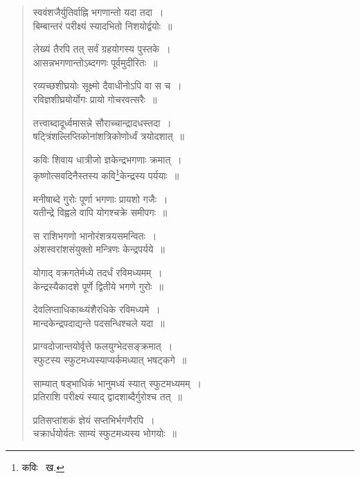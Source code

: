\documentclass[11pt, openany]{book}
\begin{document}
\begin{quote}
{\qt स्ववंशजैर्युतिर्वाह्नि भगणान्तो यदा तदा~।\\
बिम्बान्तरं परीक्ष्यं स्यादभितो निशयोर्द्वयोः~॥

लेख्यं तैरपि तत् सर्वं ग्रहयोगस्य पुस्तके~।\\
आसन्नभगणान्तोऽब्दगणः पूर्वमुदीरितः~॥

रव्यच्छशीघ्रयोः सूक्ष्मो दैवाधीनोऽपि वा स च~।\\
रविज्ञशीघ्रयोर्योगः प्रायो गोचरवत्सरैः~॥

तत्त्वाब्दादूर्ध्वमासन्ने सौराच्चान्द्रादधस्तदा~।\\
षट्त्रिंशल्लिप्तिकोनांशत्रिकोणोर्ध्वं त्रयोदशात्~॥

कविः शिवाय धात्रीजो ज्ञकेन्द्रभगणाः क्रमात्~।\\
कृष्णोत्सवदिनैस्तस्य कवि\renewcommand{\thefootnote}{१}\footnote{कविः \textendash\ ख.}केन्द्रस्य पर्ययाः~॥

मनीषाब्दे गुरोः पूर्णा भगणाः प्रायशो गजैः~।\\
यतीन्द्रे विह्वले वापि योगश्चक्रे समीपगः~॥

स राशिभगणो भानोरंशत्रयसमन्वितः~।\\
अंशस्वरांशसंयुक्तो मन्त्रिणः केन्द्रपर्यये~॥

योगाद् वक्रगतेर्मध्ये तदर्धं रविमध्यमम्~।\\
केन्द्रस्यैकादशे पूर्णे द्वितीये भगणे गुरोः~॥

देवलिप्ताधिकाब्ध्यंशैरधिके रविमध्यमे~।\\
मान्दकेन्द्रपदाद्यन्ते पदसन्धिश्चले यदा~॥

प्राग्वदोजान्तयोर्वृत्ते फलयुग्भेदसङ्क्रमात्~।\\
स्फुटस्य स्फुटमध्यस्याप्यर्कमध्यात् भषट्कगे~॥

साम्यात् षड्भाधिकं भानुमध्यं स्यात् स्फुटमध्यमम्~।\\
प्रतिराशि परीक्ष्यं स्याद् द्वादशाब्दैर्गुरोश्च तत्~॥

प्रतिसप्तांशकं ज्ञेयं सप्तभिर्भगणैरपि~।\\
चक्रार्धयोर्यतः साम्यं स्फुटमध्यस्य भोगयोः~॥} 
\end{quote}

\newpage
\end{document}
